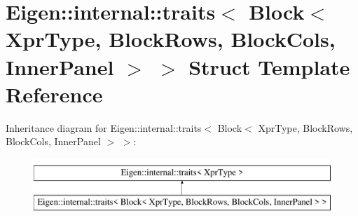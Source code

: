 \hypertarget{struct_eigen_1_1internal_1_1traits_3_01_block_3_01_xpr_type_00_01_block_rows_00_01_block_cols_00_01_inner_panel_01_4_01_4}{}\section{Eigen\+::internal\+::traits$<$ Block$<$ Xpr\+Type, Block\+Rows, Block\+Cols, Inner\+Panel $>$ $>$ Struct Template Reference}
\label{struct_eigen_1_1internal_1_1traits_3_01_block_3_01_xpr_type_00_01_block_rows_00_01_block_cols_00_01_inner_panel_01_4_01_4}
Inheritance diagram for Eigen\+::internal\+::traits$<$ Block$<$ Xpr\+Type, Block\+Rows, Block\+Cols, Inner\+Panel $>$ $>$\+:\begin{figure}[H]
\begin{center}
\leavevmode
\includegraphics[height=2.000000cm]{struct_eigen_1_1internal_1_1traits_3_01_block_3_01_xpr_type_00_01_block_rows_00_01_block_cols_00_01_inner_panel_01_4_01_4}
\end{center}
\end{figure}
